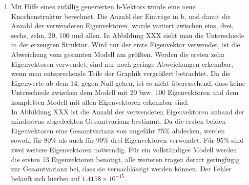 \documentclass[]{report}
\begin{document}
\begin{enumerate}
\begin{enumerate}
		\item
		Mit Hilfe eines zufällig generierten b-Vektors wurde eine neue Knochenstruktur berechnet. Die Anzahl der Einträge in b, und damit die Anzahl der verwendeten Eigenvektoren, wurde variiert zwischen eins, drei, sechs, zehn, 20, 100 und allen. In Abbildung XXX %
		sieht man die Unterschiede in der erzeugten Struktur. Wird nur der erste Eigenvektor verwendet, ist die Abweichung vom gesamten Modell am größten. Werden die ersten zehn Eigenvektoren verwendet, sind nur noch geringe Abweichungen erkennbar, wenn man entsprechende Teile der Graphik vergrößert betrachtet. Da die Eigenwerte ab dem 14. gegen Null gehen, ist es nicht überraschend, dass keine Unterschiede zwischen dem Modell mit 20 bzw. 100 Eigenvektoren und dem kompletten Modell mit allen Eigenvektoren erkennbar sind.\\
		In Abbildung XXX %
		ist die Anzahl der verwendeten Eigenvektoren anhand der mindestens abgedeckten Gesamtvarianz bestimmt. Da die ersten beiden Eigenvektoren eine Gesamtvarianz von  ungefähr 75\% abdecken, werden sowohl für 80\% als auch für 90\% drei Eigenvektoren verwendet. Für 95\% sind zwei weitere Eigenvektoren notwendig. Für ein vollständiges Modell werden die ersten 13 Eigenvektoren benötigt, alle weiteren tragen derart geringfügig zur Gesamtvarianz bei, dass sie vernachlässigt werden können. Der Fehler beläuft sich hierbei auf $1.4158\times 10^{-15}$.
	\end{enumerate}
\end{enumerate}
\end{document}
